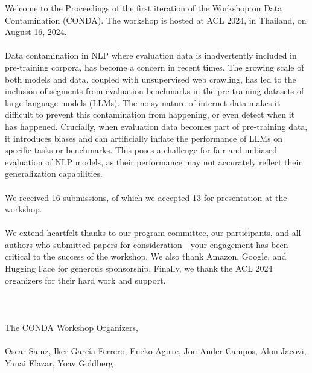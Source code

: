 Welcome to the Proceedings of the first iteration of the Workshop on Data Contamination (CONDA). The workshop is hosted at ACL 2024, in Thailand, on August 16, 2024.
\\\\
Data contamination in NLP where evaluation data is inadvertently included in pre-training corpora, has become a concern in recent times. The growing scale of both models and data, coupled with unsupervised web crawling, has led to the inclusion of segments from evaluation benchmarks in the pre-training datasets of large language models (LLMs). The noisy nature of internet data makes it difficult to prevent this contamination from happening, or even detect when it has happened. Crucially, when evaluation data becomes part of pre-training data, it introduces biases and can artificially inflate the performance of LLMs on specific tasks or benchmarks. This poses a challenge for fair and unbiased evaluation of NLP models, as their performance may not accurately reflect their generalization capabilities.
\\\\
We received 16 submissions, of which we accepted 13 for presentation at the workshop.
\\\\
We extend heartfelt thanks to our program committee, our participants, and all authors who submitted papers for consideration---your engagement has been critical to the success of the workshop. We also thank Amazon, Google, and Hugging Face for generous sponsorship. Finally, we thank the ACL 2024 organizers for their hard work and support.
\\\\\\\\
The CONDA Workshop Organizers,
\\\\
Oscar Sainz, Iker García Ferrero, Eneko Agirre, Jon Ander Campos, Alon Jacovi, Yanai Elazar, Yoav Goldberg